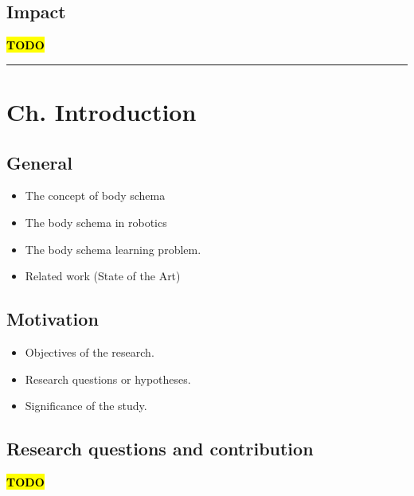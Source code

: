 \documentclass[12pt, a4paper]{article}
\newcommand{\TODO}{\hl{\textbf{TODO}}}
\begin{document}
\subsection*{Impact}
\TODO

\rule{\textwidth}{0.4pt}

\section*{Ch. Introduction}

\subsection*{General}
\begin{itemize}
	\item The concept of body schema
	\item The body schema in robotics
	\item The body schema learning problem.
	\item Related work (State of the Art)

\end{itemize}

\subsection*{Motivation}
\begin{itemize}
	\item Objectives of the research.
	\item Research questions or hypotheses.
	\item Significance of the study.
\end{itemize}

\subsection*{Research questions and contribution}
\TODO
\end{document}
